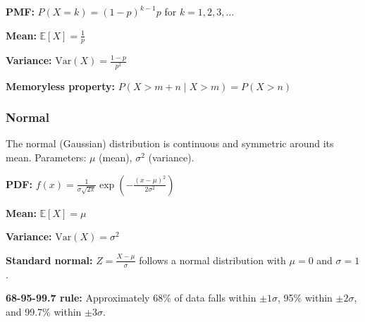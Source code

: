 \textbf{PMF:} $P(X = k) = (1-p)^{k-1}p$ for $k = 1, 2, 3, \ldots$

\textbf{Mean:} $\mathbb{E}[X] = \frac{1}{p}$

\textbf{Variance:} $\text{Var}(X) = \frac{1-p}{p^2}$

\textbf{Memoryless property:} $P(X > m + n \mid X > m) = P(X > n)$

\subsubsection{Normal}

The normal (Gaussian) distribution is continuous and symmetric around its mean. Parameters: $\mu$ (mean), $\sigma^2$ (variance).

\textbf{PDF:} $f(x) = \frac{1}{\sigma\sqrt{2\pi}} \exp\left(-\frac{(x-\mu)^2}{2\sigma^2}\right)$

\textbf{Mean:} $\mathbb{E}[X] = \mu$

\textbf{Variance:} $\text{Var}(X) = \sigma^2$

\textbf{Standard normal:} $Z = \frac{X - \mu}{\sigma}$ follows a normal distribution with $\mu = 0$ and $\sigma = 1$.

\textbf{68-95-99.7 rule:} Approximately 68\% of data falls within $\pm 1\sigma$, 95\% within $\pm 2\sigma$, and 99.7\% within $\pm 3\sigma$.

